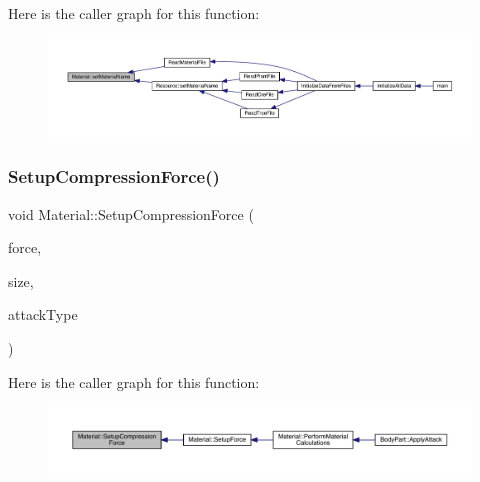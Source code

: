 Here is the caller graph for this function\+:
\nopagebreak
\begin{figure}[H]
\begin{center}
\leavevmode
\includegraphics[width=350pt]{dc/dee/class_material_ab73b88e094cf38d28f9addfd12357b04_icgraph}
\end{center}
\end{figure}
\mbox{\label{class_material_a9fa7b190d0621069612e848150e780ee}} 
\subsubsection{\texorpdfstring{Setup\+Compression\+Force()}{SetupCompressionForce()}}
{\footnotesize\ttfamily void Material\+::\+Setup\+Compression\+Force (\begin{DoxyParamCaption}\item[{float}]{force,  }\item[{float}]{size,  }\item[{\mbox{\hyperlink{_enum_types_8hpp_a904b2f9c8f3951116c343784c59d6afe}{Attack\+Type}}}]{attack\+Type }\end{DoxyParamCaption})\hspace{0.3cm}{\ttfamily [private]}}

Here is the caller graph for this function\+:
\nopagebreak
\begin{figure}[H]
\begin{center}
\leavevmode
\includegraphics[width=350pt]{dc/dee/class_material_a9fa7b190d0621069612e848150e780ee_icgraph}
\end{center}
\end{figure}
\mbox{\label{class_material_aa2951eaa13d1f8137cc228ccc9b0c33c}} 

